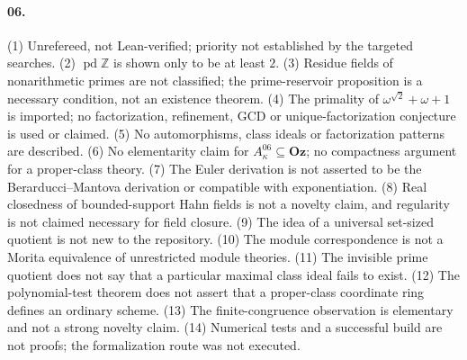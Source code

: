 \documentclass[11pt,letterpaper]{article}
\numberwithin{equation}{section}
\theoremstyle{definition}
\theoremstyle{remark}
\theoremstyle{plain}
\newcommand{\Oz}{\mathbf{Oz}}
\newcommand{\Z}{\mathbb Z}
\newcommand{\pd}{\operatorname{pd}}
\begin{document}
\paragraph{06.} (1) Unrefereed, not Lean-verified; priority not established by the targeted searches.
(2) $\pd\Z$ is shown only to be at least $2$. (3) Residue fields of nonarithmetic primes are not
classified; the prime-reservoir proposition is a necessary condition, not an existence theorem.
(4) The primality of $\omega^{\sqrt2}+\omega+1$ is imported; no factorization, refinement, GCD or
unique-factorization conjecture is used or claimed. (5) No automorphisms, class ideals or factorization
patterns are described. (6) No elementarity claim for $A^{06}_\kappa\subseteq\Oz$; no compactness
argument for a proper-class theory. (7) The Euler derivation is not asserted to be the
Berarducci--Mantova derivation or compatible with exponentiation. (8) Real closedness of
bounded-support Hahn fields is not a novelty claim, and regularity is not claimed necessary for field
closure. (9) The idea of a universal set-sized quotient is not new to the repository. (10) The module
correspondence is not a Morita equivalence of unrestricted module theories. (11) The invisible prime
quotient does not say that a particular maximal class ideal fails to exist. (12) The polynomial-test
theorem does not assert that a proper-class coordinate ring defines an ordinary scheme. (13) The
finite-congruence observation is elementary and not a strong novelty claim. (14) Numerical tests and a
successful build are not proofs; the formalization route was not executed.
\end{document}
